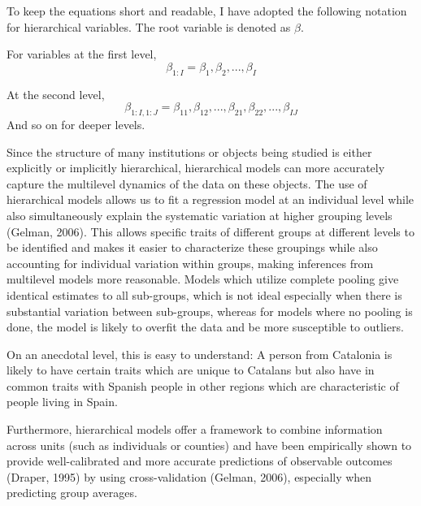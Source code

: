 \documentclass[]{article}
\begin{document}
To keep the equations short and readable, I have adopted the following
notation for hierarchical variables. The root variable is denoted as
\(\beta\).

For variables at the first level,
\[\beta_{1:I} = \beta_1, \beta_2, ..., \beta_I\]

At the second level,
\[\beta_{1:I,1:J} = \beta_{11}, \beta_{12}, ..., \beta_{21}, \beta_{22}, ...,\beta_{IJ}\]
And so on for deeper levels. \newline \newline \newline

\newpage

 \newline \newline \newline
{} \newline 

Since the structure of many institutions or objects being studied is
either explicitly or implicitly hierarchical, hierarchical models can
more accurately capture the multilevel dynamics of the data on these
objects. The use of hierarchical models allows us to fit a regression
model at an individual level while also simultaneously explain the
systematic variation at higher grouping levels (Gelman, 2006). This
allows specific traits of different groups at different levels to be
identified and makes it easier to characterize these groupings while
also accounting for individual variation within groups, making
inferences from multilevel models more reasonable. Models which utilize
complete pooling give identical estimates to all sub-groups, which is
not ideal especially when there is substantial variation between
sub-groups, whereas for models where no pooling is done, the model is
likely to overfit the data and be more susceptible to outliers.

On an anecdotal level, this is easy to understand: A person from
Catalonia is likely to have certain traits which are unique to Catalans
but also have in common traits with Spanish people in other regions
which are characteristic of people living in Spain.

Furthermore, hierarchical models offer a framework to combine
information across units (such as individuals or counties) and have been
empirically shown to provide well-calibrated and more accurate
predictions of observable outcomes (Draper, 1995) by using
cross-validation (Gelman, 2006), especially when predicting group
averages.
\end{document}
